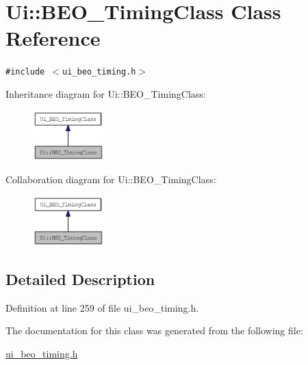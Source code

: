 \hypertarget{class_ui_1_1_b_e_o___timing_class}{
\section{Ui::BEO\_\-TimingClass Class Reference}
\label{class_ui_1_1_b_e_o___timing_class}
}
{\tt \#include $<$ui\_\-beo\_\-timing.h$>$}

Inheritance diagram for Ui::BEO\_\-TimingClass:\nopagebreak
\begin{figure}[H]
\begin{center}
\leavevmode
\includegraphics[width=77pt]{class_ui_1_1_b_e_o___timing_class__inherit__graph}
\end{center}
\end{figure}
Collaboration diagram for Ui::BEO\_\-TimingClass:\nopagebreak
\begin{figure}[H]
\begin{center}
\leavevmode
\includegraphics[width=77pt]{class_ui_1_1_b_e_o___timing_class__coll__graph}
\end{center}
\end{figure}


\subsection{Detailed Description}


Definition at line 259 of file ui\_\-beo\_\-timing.h.

The documentation for this class was generated from the following file:\begin{CompactItemize}
\item 
\hyperlink{ui__beo__timing_8h}{ui\_\-beo\_\-timing.h}\end{CompactItemize}
